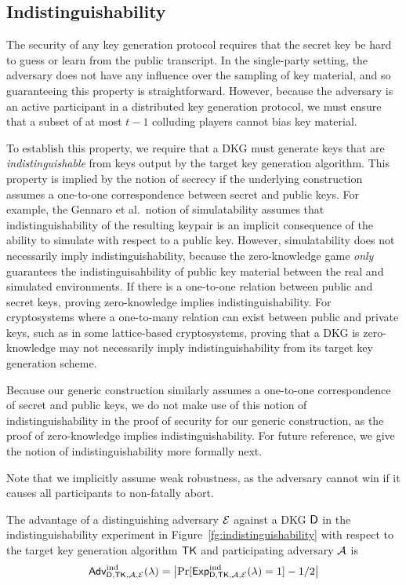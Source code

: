 \subsection{Indistinguishability}
\label{defn:indistinguishability}

The security of any key generation protocol requires that the secret key be hard to guess or learn from the public transcript.
In the single-party setting, the adversary does not have any influence over the sampling of key material,
and so guaranteeing this property is straightforward.
However, because the adversary is an active participant in a distributed key generation protocol,
we must ensure that a subset of at most $t-1$ colluding players cannot bias key material.

To establish this property,
we require that a DKG must generate keys that are \emph{indistinguishable} from keys output by the target key generation algorithm.
This property is implied by the notion of secrecy if the underlying
construction assumes a one-to-one correspondence between secret and public
keys.
For example, the Gennaro et al.\ notion of simulatability assumes that indistinguishability of the resulting keypair is an implicit consequence of the ability to simulate with respect to a public key.
However, simulatability does not necessarily imply indistinguishability,
because the zero-knowledge game \emph{only} guarantees the indistinguisahbility of public key material between the real and simulated environments.
If there is a one-to-one relation between public and secret keys,
proving zero-knowledge implies indistinguishability.
For cryptosystems where a one-to-many relation can exist between public and private keys,
such as in some lattice-based cryptosystems,
proving that a DKG is zero-knowledge may not necessarily imply indistinguishability from its target key generation scheme.


Because our generic construction similarly assumes a one-to-one correspondence
of secret and public keys, we do not make use of this notion of
indistinguishability in the proof of security for our generic construction, as
the proof of zero-knowledge implies indistinguishability.
For future reference, we give the notion of indistinguishability more formally next.

Note that we implicitly assume weak robustness,
as the adversary cannot win if it causes all participants to non-fatally abort.

The advantage of a distinguishing adversary $\mathcal{E}$ against a DKG $\mathsf{D}$ in the indistinguishability experiment in Figure~\ref{fg:indistinguishability} with respect to the target key generation algorithm $\mathsf{TK}$ and participating adversary $\mathcal{A}$ is
\[
  \textsf{\upshape Adv}^{\textrm{\upshape ind}}_{\mathsf{D},\mathsf{TK},\mathcal{A},\mathcal{E}}(\lambda) = \bigl|  \Pr[\textsf{Exp}^{\textrm{ind}}_{\mathsf{D},\mathsf{TK},\mathcal{A},\mathcal{E}}(\lambda) = 1] - 1/2   \bigr|
\]

